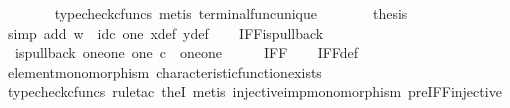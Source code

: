 \begin{isabellebody}
\ \ \ \ \ \ \isamarkupfalse%
\ {\isacharparenleft}{\kern0pt}typecheck{\isacharunderscore}{\kern0pt}cfuncs{\isacharcomma}{\kern0pt}\ metis\ terminal{\isacharunderscore}{\kern0pt}func{\isacharunderscore}{\kern0pt}unique{\isacharparenright}{\kern0pt}\isanewline
\ \ \ \ \isamarkupfalse%
\ \isamarkupfalse%
\ {\isacharquery}{\kern0pt}thesis\isanewline
\ \ \ \ \ \ \isamarkupfalse%
\ {\isacharparenleft}{\kern0pt}simp\ add{\isacharcolon}{\kern0pt}\ {\isacartoucheopen}w\ {\isacharequal}{\kern0pt}\ id\isactrlsub c\ one{\isacartoucheclose}\ x{\isacharunderscore}{\kern0pt}def\ y{\isacharunderscore}{\kern0pt}def{\isacharparenright}{\kern0pt}\isanewline
\ \ \isamarkupfalse%
\isanewline
{}\isamarkupfalse%
%
\endisatagproof
{\isafoldproof}%
%
\isadelimproof
\isanewline
%
\endisadelimproof
\isanewline
{}\isamarkupfalse%
\ IFF{\isacharunderscore}{\kern0pt}is{\isacharunderscore}{\kern0pt}pullback{\isacharcolon}{\kern0pt}\isanewline
\ \ {\isachardoublequoteopen}is{\isacharunderscore}{\kern0pt}pullback\ {\isacharparenleft}{\kern0pt}one{\isasymCoprod}one{\isacharparenright}{\kern0pt}\ one\ {\isacharparenleft}{\kern0pt}{\isasymOmega}{\isasymtimes}\isactrlsub c{\isasymOmega}{\isacharparenright}{\kern0pt}\ {\isasymOmega}\ {\isacharparenleft}{\kern0pt}{\isasymbeta}\isactrlbsub {\isacharparenleft}{\kern0pt}one{\isasymCoprod}one{\isacharparenright}{\kern0pt}\isactrlesub {\isacharparenright}{\kern0pt}\ {\isasymt}\ {\isacharparenleft}{\kern0pt}{\isasymlangle}{\isasymt}{\isacharcomma}{\kern0pt}\ {\isasymt}{\isasymrangle}\ {\isasymamalg}{\isasymlangle}{\isasymf}{\isacharcomma}{\kern0pt}\ {\isasymf}{\isasymrangle}{\isacharparenright}{\kern0pt}\ IFF{\isachardoublequoteclose}\isanewline
%
\isadelimproof
\ \ %
\endisadelimproof
%
\isatagproof
{}\isamarkupfalse%
\ IFF{\isacharunderscore}{\kern0pt}def\isanewline
\ \ \isamarkupfalse%
\ element{\isacharunderscore}{\kern0pt}monomorphism\ characteristic{\isacharunderscore}{\kern0pt}function{\isacharunderscore}{\kern0pt}exists\isanewline
\ \ \isamarkupfalse%
\ {\isacharparenleft}{\kern0pt}typecheck{\isacharunderscore}{\kern0pt}cfuncs{\isacharcomma}{\kern0pt}\ rule{\isacharunderscore}{\kern0pt}tac\ the{}I{}{\isacharcomma}{\kern0pt}\ metis\ injective{\isacharunderscore}{\kern0pt}imp{\isacharunderscore}{\kern0pt}monomorphism\ pre{\isacharunderscore}{\kern0pt}IFF{\isacharunderscore}{\kern0pt}injective{\isacharparenright}{\kern0pt}%
\endisatagproof
{\isafoldproof}%
%
\isadelimproof

\end{isabellebody}
